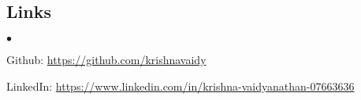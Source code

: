 \documentclass[margin,line]{res}
\newenvironment{list2}{
  \begin{list}{$\bullet$}{%
      \setlength{\itemsep}{0in}
      \setlength{\parsep}{0in} \setlength{\parskip}{0in}
      \setlength{\topsep}{0in} \setlength{\partopsep}{0in} 
      \setlength{\leftmargin}{0.2in}}}{\end{list}}
\begin{document}
\begin{resume}
\section{\sc Links}
\begin{list2}
\item Github: \url{https://github.com/krishnavaidy}
\item LinkedIn: \url{https://www.linkedin.com/in/krishna-vaidyanathan-07663636}
\end{list2}

\end{resume}
\end{document}
